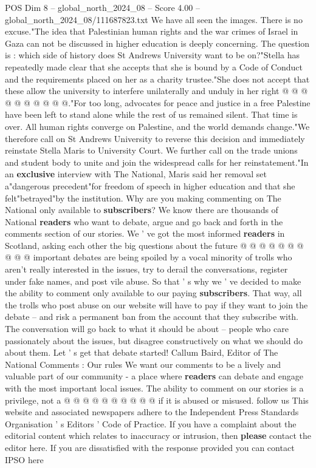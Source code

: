 \begin{textsample}{POS Dim 8 – global\_north\_2024\_08 – Score 4.00 – global\_north\_2024\_08/111687823.txt}
We have all seen the images.
There is no excuse."The idea that Palestinian human rights and the war crimes of Israel in Gaza can not be discussed in higher education is deeply concerning.
The question is : which side of history does St Andrews University want to be on?"Stella has repeatedly made clear that she accepts that she is bound by a Code of Conduct and the requirements placed on her as a charity trustee."She does not accept that these allow the university to interfere unilaterally and unduly in her right @ @ @ @ @ @ @ @ @ @."For too long, advocates for peace and justice in a free Palestine have been left to stand alone while the rest of us remained silent.
That time is over.
All human rights converge on Palestine, and the world demands change."We therefore call on St Andrews University to reverse this decision and immediately reinstate Stella Maris to University Court.
We further call on the trade unions and student body to unite and join the widespread calls for her reinstatement."In an \textbf{exclusive} interview with The National, Maris said her removal set a"dangerous precedent"for freedom of speech in higher education and that she felt"betrayed"by the institution.
Why are you making commenting on The National only available to \textbf{subscribers}?
We know there are thousands of National \textbf{readers} who want to debate, argue and go back and forth in the comments section of our stories.
We ' ve got the most informed \textbf{readers} in Scotland, asking each other the big questions about the future @ @ @ @ @ @ @ @ @ @ important debates are being spoiled by a vocal minority of trolls who aren't really interested in the issues, try to derail the conversations, register under fake names, and post vile abuse.
So that ' s why we ' ve decided to make the ability to comment only available to our paying \textbf{subscribers}.
That way, all the trolls who post abuse on our website will have to pay if they want to join the debate -- and risk a permanent ban from the account that they subscribe with.
The conversation will go back to what it should be about -- people who care passionately about the issues, but disagree constructively on what we should do about them.
Let ' s get that debate started!
Callum Baird, Editor of The National Comments : Our rules We want our comments to be a lively and valuable part of our community - a place where \textbf{readers} can debate and engage with the most important local issues.
The ability to comment on our stories is a privilege, not a @ @ @ @ @ @ @ @ @ @ if it is abused or misused. follow us This website and associated newspapers adhere to the Independent Press Standards Organisation ' s Editors ' Code of Practice.
If you have a complaint about the editorial content which relates to inaccuracy or intrusion, then \textbf{please} contact the editor here.
If you are dissatisfied with the response provided you can contact IPSO here

\end{textsample}
